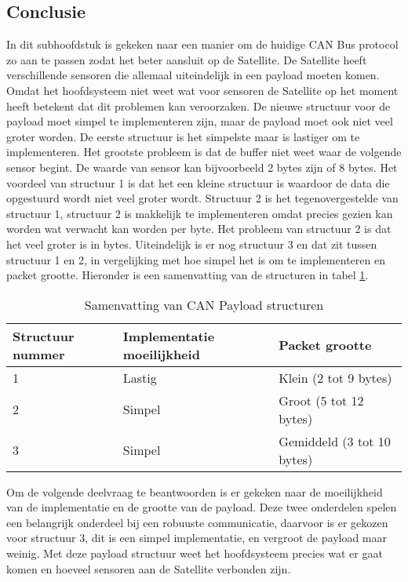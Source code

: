\subsection{Conclusie}
In dit subhoofdstuk is gekeken naar een manier om de huidige CAN Bus protocol zo aan te passen zodat het beter aansluit op de Satellite. De Satellite heeft verschillende sensoren die allemaal uiteindelijk in een payload moeten komen. Omdat het hoofdsysteem niet weet wat voor sensoren de Satellite op het moment heeft betekent dat dit problemen kan veroorzaken. De nieuwe structuur voor de payload moet simpel te implementeren zijn, maar de payload moet ook niet veel groter worden. De eerste structuur is het simpelste maar is lastiger om te implementeren. Het grootste probleem is dat de buffer niet weet waar de volgende sensor begint. De waarde van sensor kan bijvoorbeeld 2 bytes zijn of 8 bytes. Het voordeel van structuur 1 is dat het een kleine structuur is waardoor de data die opgestuurd wordt niet veel groter wordt. Structuur 2 is het tegenovergestelde van structuur 1, structuur 2 is makkelijk te implementeren omdat precies gezien kan worden wat verwacht kan worden per byte. Het probleem van structuur 2 is dat het veel groter is in bytes. Uiteindelijk is er nog structuur 3 en dat zit tussen structuur 1 en 2, in vergelijking met hoe simpel het is om te implementeren en packet grootte. Hieronder is een samenvatting van de structuren in tabel \ref{tab:samenvattingstructuur}. \newline

\begin{table}[h!]
	\centering
	\caption{Samenvatting van CAN Payload structuren}
	\label{tab:samenvattingstructuur}
	\begin{tabular}{lll}
	\toprule
		Structuur nummer & Implementatie moeilijkheid & Packet grootte             \\ \midrule
		1                & Lastig                     & Klein (2 tot 9 bytes)      \\
		2                & Simpel                     & Groot (5 tot 12 bytes)     \\
		3                & Simpel                     & Gemiddeld (3 tot 10 bytes) \\ \bottomrule
	\end{tabular}%
\end{table}

\noindent Om de volgende deelvraag te beantwoorden is er gekeken naar de moeilijkheid van de implementatie en de grootte van de payload. Deze twee onderdelen spelen een belangrijk onderdeel bij een robuuste communicatie, daarvoor is er gekozen voor structuur 3, dit is een simpel implementatie, en vergroot de payload maar weinig. Met deze payload structuur weet het hoofdsysteem precies wat er gaat komen en hoeveel sensoren aan de Satellite verbonden zijn.